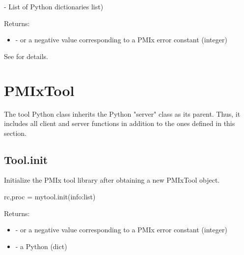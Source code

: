 \begin{arglist}
 - List of Python  dictionaries list)
\end{arglist}

Returns:

\begin{itemize}
    \item {} -  or a negative value corresponding to a PMIx error constant (integer)
\end{itemize}

See  for details.


\section{PMIxTool}
\label{app:python:tool}

The tool Python class inherits the Python "server" class as its parent. Thus, it includes all client and server functions in addition to the ones defined in this section.


\subsection{Tool.init}

\summary

Initialize the \ac{PMIx} tool library after obtaining a new PMIxTool object.

\format

\pyspecificstart
\begin{codepar}
rc,proc = mytool.init(info:list)
\end{codepar}
\pyspecificend


\begin{arglist}
\end{arglist}

Returns:

\begin{itemize}
    \item {} -  or a negative value corresponding to a PMIx error constant (integer)
    \item {} - a Python  (dict)
\end{itemize}

